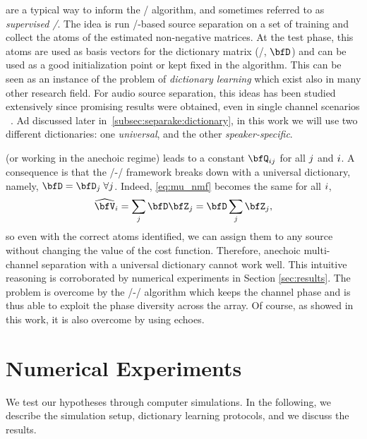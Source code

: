  are a typical way to inform the \NMF/ algorithm, and sometimes referred to as \textit{supervised \NMF/}.
The idea is run \NMF/-based source separation on a set of training and collect the atoms of the estimated non-negative matrices.
At the test phase, this atoms are used as basis vectors for the dictionary matrix (\ie/, $\mD$) and can be used as a good initialization point or kept fixed in the algorithm.
This can be seen as an instance of the problem of \textit{dictionary learning} which exist also in many other research field.
For audio source separation, this ideas has been studied extensively since promising results were obtained, even in single channel scenarios ~.
Ad discussed later in~\cref{subsec:separake:dictionary}, in this work we will use two different dictionaries: one \textit{universal}, and the other \textit{speaker-specific}.

 (or working in the anechoic regime) leads to a constant $\vQ_{\idxMicSrc}$ for all $j$ and $i$.
A consequence is that the \MU/-\NMF/ framework breaks down with a universal dictionary, namely, $\mD = \mD_j\;\forall j$.
Indeed, \eqref{eq:mu_nmf} becomes the same for all $i$,
\begin{equation*}
    \wh{\mV}_\idxMic = \sum_{\idxSrc} \mD \mZ_\idxSrc = \mD \sum_\idxSrc \mZ_\idxSrc,
\end{equation*}
so even with the correct atoms identified, we can assign them to any source without changing the value of the cost function.
Therefore, anechoic multi-channel separation with a universal dictionary cannot work well.
This intuitive reasoning is corroborated by numerical experiments in Section \ref{sec:results}.
The problem is overcome by the \EM/-\NMF/ algorithm which keeps the channel phase and is thus able to exploit the phase diversity across the array.
Of course, as showed in this work, it is also overcome by using echoes.

\section{Numerical Experiments}

We test our hypotheses through computer simulations.
In the following, we describe the simulation setup, dictionary learning protocols, and we discuss the results.

